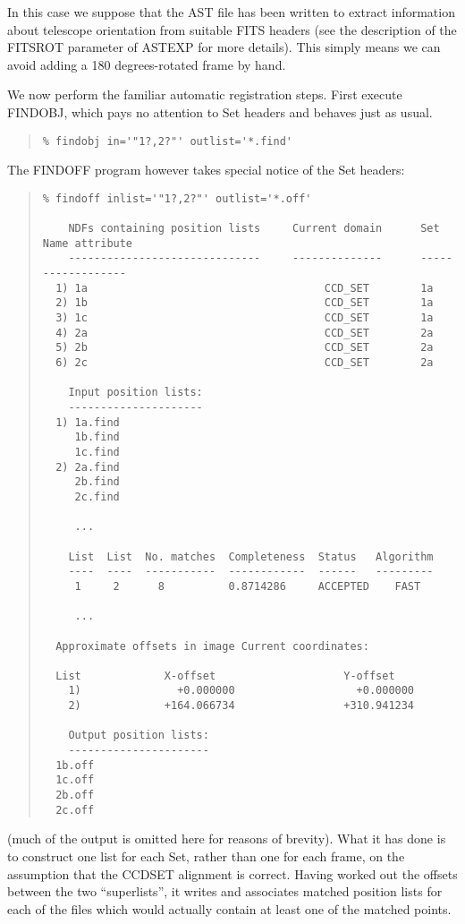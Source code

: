 \documentclass[twoside,11pt]{article}
\newcommand{\htmlref}[2]{#1}
\newcommand{\latexhtml}[2]{#1}
\renewcommand{\_}{\texttt{\symbol{95}}}
\newcommand{\ttsize}{\latexhtml{\small}{}}
\newenvironment{myquote}{\begin{quote}\ttsize}{\end{quote}}
\newcommand{\xroutine}[1]{\htmlref{{\sc #1}}{#1}}
\begin{document}
In this case we suppose that the AST file has been written to extract 
information about telescope orientation from suitable FITS headers 
(see the description of the FITSROT parameter of \xroutine{ASTEXP}
for more details).  This simply means we can avoid adding a
180 degrees-rotated frame by hand.

We now perform the familiar automatic registration steps.
First execute \xroutine{FINDOBJ}, which pays no attention to Set headers
and behaves just as usual.
\begin{myquote}
\begin{verbatim}
% findobj in='"1?,2?"' outlist='*.find'
\end{verbatim}
\end{myquote}
The \xroutine{FINDOFF} program however takes special notice 
of the Set headers:
\begin{myquote}
\begin{verbatim}
% findoff inlist='"1?,2?"' outlist='*.off'

    NDFs containing position lists     Current domain      Set Name attribute
    ------------------------------     --------------      ------------------
  1) 1a                                     CCD_SET        1a
  2) 1b                                     CCD_SET        1a
  3) 1c                                     CCD_SET        1a
  4) 2a                                     CCD_SET        2a
  5) 2b                                     CCD_SET        2a
  6) 2c                                     CCD_SET        2a

    Input position lists:
    ---------------------
  1) 1a.find
     1b.find
     1c.find
  2) 2a.find
     2b.find
     2c.find

     ...

    List  List  No. matches  Completeness  Status   Algorithm
    ----  ----  -----------  ------------  ------   ---------
     1     2      8          0.8714286     ACCEPTED    FAST

     ...

  Approximate offsets in image Current coordinates:

  List             X-offset                    Y-offset
    1)               +0.000000                   +0.000000
    2)             +164.066734                 +310.941234

    Output position lists:
    ----------------------
  1b.off
  1c.off
  2b.off
  2c.off
\end{verbatim}
\end{myquote}
(much of the output is omitted here for reasons of brevity).
What it has done is to construct one list for each Set, rather than
one for each frame, on the assumption that the CCD\_SET 
alignment is correct.
Having worked out the offsets between the two ``superlists'', 
it writes and associates matched position lists for each of the files
which would actually contain at least one of the matched points.
\end{document}
